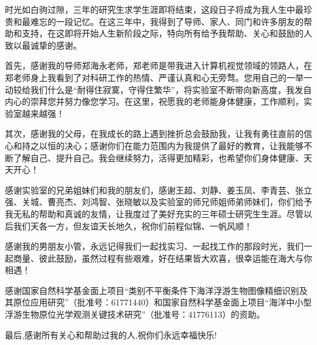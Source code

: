 \begin{acknowledgement}
时光如白驹过隙，三年的研究生求学生涯即将结束，这段日子将成为我人生中最珍贵和最难忘的一段记忆。在这三年中，我得到了导师、家人、同门和许多朋友的帮助和支持，在这即将开始人生新阶段之际，特向所有给予我帮助、关心和鼓励的人致以最诚挚的感谢。

首先，感谢我的导师郑海永老师，郑老师是带我进入计算机视觉领域的领路人，在郑老师身上我看到了对科研工作的热情、严谨认真和心无旁骛。您用自己的一举一动较给我们什么是“耐得住寂寞，守得住繁华”，将实验室不断带向新高度，我发自内心的崇拜您并努力像您学习。在这里，祝愿我的老师能身体健康，工作顺利，实验室越来越强！

其次，感谢我的父母，在我成长的路上遇到挫折总会鼓励我，让我有勇往直前的信心和持之以恒的决心；感谢你们在能力范围内为我提供了最好的教育，让我能够不断了解自己、提升自己。我会继续努力，活得更加精彩，也希望你们身体健康、天天开心！

感谢实验室的兄弟姐妹们和我的朋友们，感谢王超、刘静、姜玉凤、李青芸、张立强、关城、曹亮杰、刘鸿智、张晓敏以及实验室的师兄师姐师弟师妹们，你们给予我无私的帮助和真诚的友情，让我度过了美好充实的三年硕士研究生生涯。尽管以后我们天各一方，但友谊天长地久，祝你们前程似锦、一帆风顺！

感谢我的男朋友小管，永远记得我们一起找实习、一起找工作的那段时光，我们一起商量、彼此鼓励，虽然过程有些艰难，好在结果皆大欢喜，很幸运能在海大与你相遇！

感谢国家自然科学基金面上项目“类别不平衡条件下海洋浮游生物图像精细识别及其原位应用研究”（批准号：61771440）和国家自然科学基金面上项目“海洋中小型浮游生物原位光学观测关键技术研究”（批准号：41776113）的资助。

最后,感谢所有关心和帮助过我的人,祝你们永远幸福快乐!

\end{acknowledgement}
